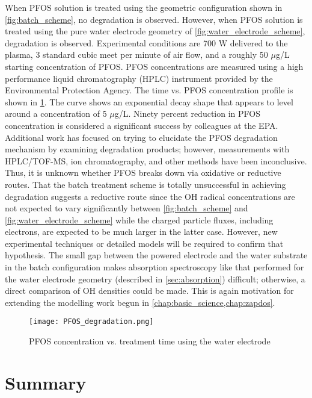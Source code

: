  When PFOS solution is treated using the geometric configuration shown in \cref{fig:batch_scheme}, no degradation is observed.  However, when PFOS solution is treated using the pure water electrode geometry of \cref{fig:water_electrode_scheme}, degradation is observed. Experimental conditions are 700 W delivered to the plasma, 3 standard cubic meet per minute of air flow, and a roughly 50 $\mu$g/L starting concentration of PFOS. PFOS concentrations are measured using a high performance liquid chromatography (HPLC) instrument provided by the Environmental Protection Agency. The time vs. PFOS concentration profile is shown in \cref{fig:PFOS_degradation}. The curve shows an exponential decay shape that appears to level around a concentration of 5 $\mu$g/L. Ninety percent reduction in PFOS concentration is considered a significant success by colleagues at the EPA. Additional work has focused on trying to elucidate the PFOS degradation mechanism by examining degradation products; however, measurements with HPLC/TOF-MS, ion chromatography, and other methods have been inconclusive. Thus, it is unknown whether PFOS breaks down via oxidative or reductive routes. That the batch treatment scheme is totally unsuccessful in achieving degradation suggests a reductive route since the OH radical concentrations are not expected to vary significantly between \cref{fig:batch_scheme} and \cref{fig:water_electrode_scheme} while the charged particle fluxes, including electrons, are expected to be much larger in the latter case. However, new experimental techniques or detailed models will be required to confirm that hypothesis. The small gap between the powered electrode and the water substrate in the batch configuration makes absorption spectroscopy like that performed for the water electrode geometry (described in \cref{sec:absorption}) difficult; otherwise, a direct comparison of OH densities could be made. This is again motivation for extending the modelling work begun in \cref{chap:basic_science,chap:zapdos}.

\begin{figure}[htbp]
  \centering
  \texttt{[image: PFOS\_degradation.png]}
  \caption{PFOS concentration vs. treatment time using the water electrode}
  \label{fig:PFOS_degradation}
\end{figure}

\section{Summary}

